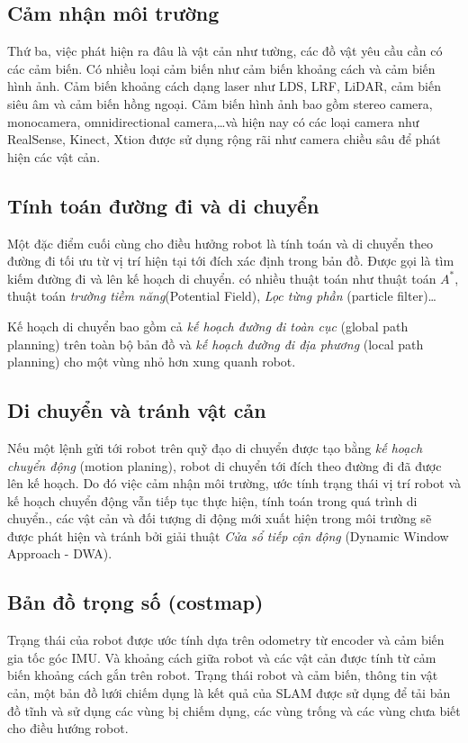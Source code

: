 {\subsection*{Cảm nhận môi trường}
Thứ ba, việc phát hiện ra đâu là vật cản như tường, các đồ vật yêu cầu cần có các cảm biến. Có nhiều loại cảm biến như cảm biến khoảng cách và cảm biến hình ảnh. Cảm biến khoảng cách dạng laser như LDS, LRF, LiDAR, cảm biến siêu âm và cảm biến hồng ngoại. Cảm biến hình ảnh bao gồm stereo camera, monocamera, omnidirectional camera,\dots và hiện nay có các loại camera như RealSense, Kinect, Xtion được sử dụng rộng rãi như camera chiều sâu để phát hiện các vật cản.

\subsection*{Tính toán đường đi và di chuyển}
Một đặc điểm cuối cùng cho điều hưởng robot là tính toán và di chuyển theo đường đi tối ưu từ vị trí hiện tại tới đích xác định trong bản đồ. Được gọi là tìm kiếm đường đi và lên kế hoạch di chuyển. có nhiều thuật toán như thuật toán ${A}^{*}$, thuật toán \textit{trường tiềm năng}(Potential Field), \textit{Lọc từng phần} (particle filter)\dots

Kế hoạch di chuyển bao gồm cả \textit{kế hoạch đường đi toàn cục} (global path planning) trên toàn bộ bản đồ và \textit{kế hoạch đường đi địa phương} (local path planning) cho một vùng nhỏ hơn xung quanh robot.

\subsection*{Di chuyển và tránh vật cản}
Nếu một lệnh gửi tới robot trên quỹ đạo di chuyển được tạo bằng \textit{kế hoạch chuyển động} (motion planing), robot di chuyển tới đích theo đường đi đã được lên kế hoạch. Do đó việc cảm nhận môi trường, ước tính trạng thái vị trí robot và kế hoạch chuyển động vẫn tiếp tục thực hiện, tính toán trong quá trình di chuyển., các vật cản và đối tượng di động mới xuất hiện trong môi trường sẽ được phát hiện và tránh bởi giải thuật \textit{Cửa sổ tiếp cận động} (Dynamic Window Approach - DWA).

\subsection{Bản đồ trọng số (costmap)}

Trạng thái của robot được ước tính dựa trên odometry từ encoder và cảm biến gia tốc góc IMU. Và khoảng cách giữa robot và các vật cản được tính từ cảm biến khoảng cách gắn trên robot. Trạng thái robot và cảm biến, thông tin vật cản, một bản đồ lưới chiếm dụng là kết quả của SLAM được sử dụng để tải bản đồ tĩnh và sử dụng các vùng bị chiếm dụng, các vùng trống và các vùng chưa biết cho điều hướng robot.

}
